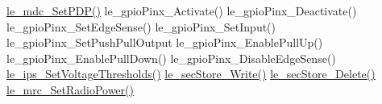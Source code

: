 \hyperlink{le__mdc__interface_8h_a73e66a7a63dc95d7f261fc2a26470386}{le\+\_\+mdc\+\_\+\+Set\+P\+D\+P()} le\+\_\+gpio\+Pinx\+\_\+\+Activate() le\+\_\+gpio\+Pinx\+\_\+\+Deactivate() le\+\_\+gpio\+Pinx\+\_\+\+Set\+Edge\+Sense() le\+\_\+gpio\+Pinx\+\_\+\+Set\+Input() le\+\_\+gpio\+Pinx\+\_\+\+Set\+Push\+Pull\+Output le\+\_\+gpio\+Pinx\+\_\+\+Enable\+Pull\+Up() le\+\_\+gpio\+Pinx\+\_\+\+Enable\+Pull\+Down() le\+\_\+gpio\+Pinx\+\_\+\+Disable\+Edge\+Sense() \hyperlink{le__ips__interface_8h_ab019313758c21f7a390f7a6061583121}{le\+\_\+ips\+\_\+\+Set\+Voltage\+Thresholds()} \hyperlink{le__sec_store__interface_8h_a67ef7540ad79e9621a18acdf2d3427ae}{le\+\_\+sec\+Store\+\_\+\+Write()} \hyperlink{le__sec_store__interface_8h_a5d5c156d080e4e4f40fcf7e46c2790e7}{le\+\_\+sec\+Store\+\_\+\+Delete()} \hyperlink{le__mrc__interface_8h_a78bd27d92337e2122320f41bcaa5480f}{le\+\_\+mrc\+\_\+\+Set\+Radio\+Power()}

